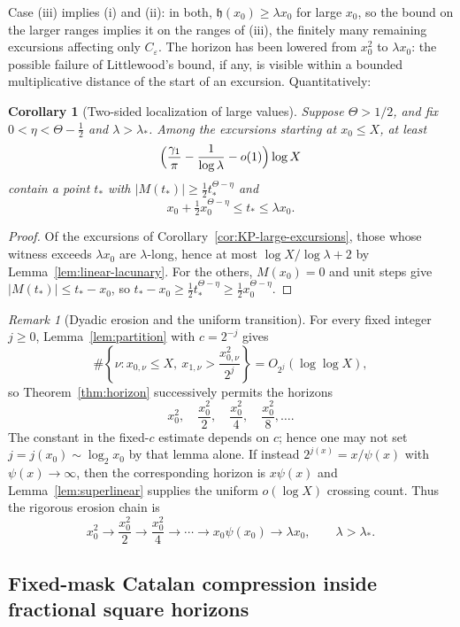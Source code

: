 \documentclass[11pt]{amsart}
\numberwithin{equation}{section}
\theoremstyle{plain}
\newtheorem{corollary}[theorem]{Corollary}
\theoremstyle{definition}
\theoremstyle{remark}
\newtheorem{remark}[theorem]{Remark}
\newcommand{\eps}{\varepsilon}
\begin{document}
Case (iii) implies (i) and (ii): in both, $\mathfrak h(x_0)\ge\lambda x_0$ for large
$x_0$, so the bound on the larger ranges implies it on the ranges of (iii),
the finitely many remaining excursions affecting only $C_\eps$. The horizon has
been lowered from $x_0^2$ to $\lambda x_0$: the possible failure of
Littlewood's bound, if any, is visible within a bounded multiplicative
distance of the start of an excursion. Quantitatively:

\begin{corollary}[Two-sided localization of large values]
\label{cor:two-sided}
Suppose $\Theta>1/2$, and fix $0<\eta<\Theta-\frac12$ and $\lambda>\lambda_*$.
Among the excursions starting at $x_0\le X$, at least
\[
\Bigl(\frac{\gamma_1}{\pi}-\frac1{\log\lambda}-o(1)\Bigr)\log X
\]
contain a point $t_*$ with $|M(t_*)|\ge\frac12t_*^{\Theta-\eta}$ and
\[
x_0+\tfrac12x_0^{\Theta-\eta}\le t_*\le\lambda x_0 .
\]
\end{corollary}

\begin{proof}
Of the excursions of Corollary~\ref{cor:KP-large-excursions}, those whose
witness exceeds $\lambda x_0$ are $\lambda$-long, hence at most
$\log X/\log\lambda+2$ by Lemma~\ref{lem:linear-lacunary}. For the others,
$M(x_0)=0$ and unit steps give $|M(t_*)|\le t_*-x_0$, so
$t_*-x_0\ge\frac12t_*^{\Theta-\eta}\ge\frac12x_0^{\Theta-\eta}$.
\end{proof}


\begin{remark}[Dyadic erosion and the uniform transition]
\label{rem:dyadic-erosion}
For every fixed integer $j\ge0$, Lemma~\ref{lem:partition} with
$c=2^{-j}$ gives
\[
\#\left\{\nu:x_{0,\nu}\le X,\ x_{1,\nu}>
\frac{x_{0,\nu}^2}{2^j}\right\}=O_{2^j}(\log\log X),
\]
so Theorem~\ref{thm:horizon} successively permits the horizons
\[
x_0^2,\quad \frac{x_0^2}{2},\quad \frac{x_0^2}{4},\quad
\frac{x_0^2}{8},\ldots.
\]
The constant in the fixed-$c$ estimate depends on $c$; hence one may not set
$j=j(x_0)\sim\log_2x_0$ by that lemma alone.  If instead
$2^{j(x)}=x/\psi(x)$ with $\psi(x)\to\infty$, then the corresponding
horizon is $x\psi(x)$ and Lemma~\ref{lem:superlinear} supplies the uniform
$o(\log X)$ crossing count.  Thus the rigorous erosion chain is
\[
x_0^2\to\frac{x_0^2}{2}\to\frac{x_0^2}{4}\to\cdots
\to x_0\psi(x_0)\to\lambda x_0,\qquad\lambda>\lambda_*.
\]
\end{remark}

\subsection{Fixed-mask Catalan compression inside fractional square horizons}
\label{subsec:catalan-square}
\end{document}
